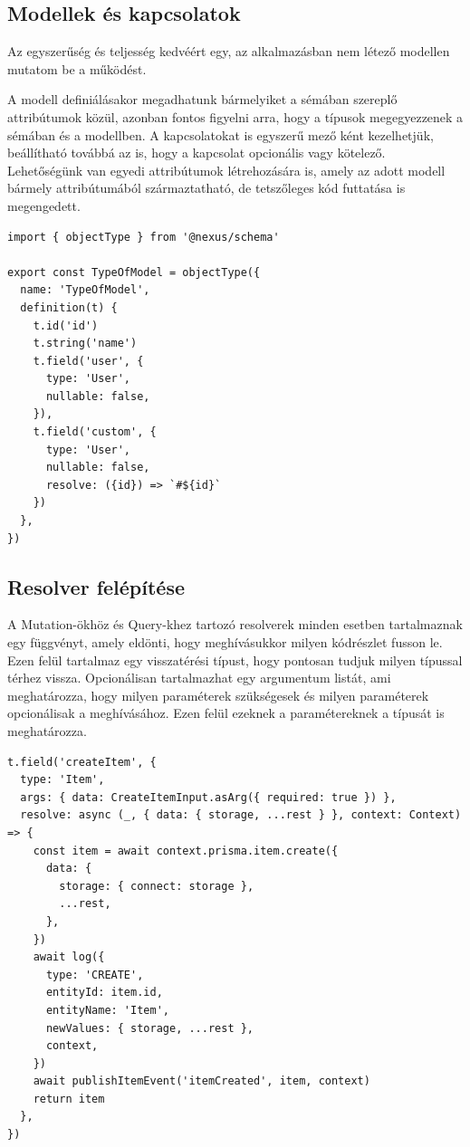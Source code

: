 \subsection{Modellek és kapcsolatok}
Az egyszerűség és teljesség kedvéért egy, az alkalmazásban nem létező modellen mutatom be a működést.

A modell definiálásakor megadhatunk bármelyiket a sémában szereplő attribútumok közül, azonban fontos figyelni arra, hogy a típusok megegyezzenek a sémában és a modellben.
A kapcsolatokat is egyszerű mező ként kezelhetjük, beállítható továbbá az is, hogy a kapcsolat opcionális vagy kötelező.
Lehetőségünk van egyedi attribútumok létrehozására is, amely az adott modell bármely attribútumából származtatható, de tetszőleges kód futtatása is megengedett.

\begin{lstlisting}[style=ES6, caption={Példa model}]
import { objectType } from '@nexus/schema'

export const TypeOfModel = objectType({
  name: 'TypeOfModel',
  definition(t) {
    t.id('id')
    t.string('name')
    t.field('user', {
      type: 'User',
      nullable: false,
    }),
    t.field('custom', {
      type: 'User',
      nullable: false,
      resolve: ({id}) => `#${id}`
    })
  },
})
\end{lstlisting}

\subsection{Resolver felépítése}
A Mutation-ökhöz és Query-khez tartozó resolverek minden esetben tartalmaznak egy függvényt, amely eldönti, hogy meghívásukkor milyen kódrészlet fusson le.
Ezen felül tartalmaz egy visszatérési típust, hogy pontosan tudjuk milyen típussal térhez vissza.
Opcionálisan tartalmazhat egy argumentum listát, ami meghatározza, hogy milyen paraméterek szükségesek és milyen paraméterek opcionálisak a meghívásához.
Ezen felül ezeknek a paramétereknek a típusát is meghatározza. 
\begin{lstlisting}[style=ES6, caption={Eszköz létrehozás resolver}]
t.field('createItem', {
  type: 'Item',
  args: { data: CreateItemInput.asArg({ required: true }) },
  resolve: async (_, { data: { storage, ...rest } }, context: Context) => {
    const item = await context.prisma.item.create({
      data: {
        storage: { connect: storage },
        ...rest,
      },
    })
    await log({
      type: 'CREATE',
      entityId: item.id,
      entityName: 'Item',
      newValues: { storage, ...rest },
      context,
    })
    await publishItemEvent('itemCreated', item, context)
    return item
  },
})
\end{lstlisting}

